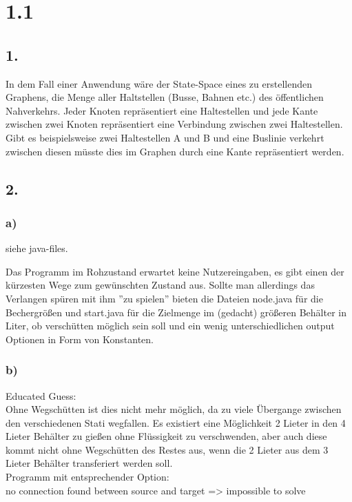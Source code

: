 \documentclass[a4paper,11pt,fleqn]{scrartcl}
\title{\titleinfo}
\author{\authorinfo}
\begin{document}
\maketitle

\section*{1.1}
\subsection*{1.}
In dem Fall einer Anwendung wäre der State-Space eines zu erstellenden Graphens, die Menge aller Haltstellen (Busse, Bahnen etc.) des öffentlichen Nahverkehrs. Jeder Knoten repräsentiert eine Haltestellen und jede Kante zwischen zwei Knoten repräsentiert eine Verbindung zwischen zwei Haltestellen. Gibt es beispielsweise zwei Haltestellen A und B und eine Buslinie verkehrt zwischen diesen müsste dies im Graphen durch eine Kante repräsentiert werden.  
\subsection*{2.}
\subsubsection*{a)}
siehe java-files. \\
\begin{small}
Das Programm im Rohzustand erwartet keine Nutzereingaben, es gibt einen der kürzesten Wege zum gewünschten Zustand aus.
Sollte man allerdings das Verlangen spüren mit ihm ''zu spielen'' bieten die Dateien node.java für die Bechergrößen und start.java für die Zielmenge im (gedacht) größeren Behälter in Liter, ob verschütten möglich sein soll und ein wenig unterschiedlichen output Optionen in Form von Konstanten.
\end{small}

\subsubsection*{b)}
Educated Guess: \\
Ohne Wegschütten ist dies nicht mehr möglich, da zu viele Übergange zwischen den verschiedenen Stati wegfallen. Es existiert eine Möglichkeit 2 Lieter in den 4 Lieter Behälter zu gießen ohne Flüssigkeit zu verschwenden, aber auch diese kommt nicht ohne Wegschütten des Restes aus, wenn die 2 Lieter aus dem 3 Lieter Behälter transferiert werden soll. \\
Programm mit entsprechender Option: \\
no connection found between source and target => impossible to solve
\end{document}

